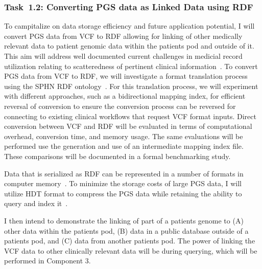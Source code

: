 \documentclass[a4paper,11pt]{article}
\begin{document}
\begin{refsection}
\newcommand\WPab{Converting PGS data as Linked Data using RDF}
\subsubsection{Task~1.2: \WPab}

To campitalize on data storage efficiency and future application potential, I will convert PGS data from VCF to RDF allowing for linking of other medically relevant data to patient genomic data within the patient\textquotesingle s pod and outside of it.
This aim will address well documented current challenges in medicial record utilization relating to scatteredness of pertinent clinical information~\cite{...}.
To convert PGS data from VCF to RDF, we will investigate a format translation process using the SPHN RDF ontology~\cite{van_der_horst_bridging_2023}. 
For this translation process, we will experiment with different approaches, such as a bidirectional mapping index, for efficient reversal of conversion to ensure the conversion process can be reversed for connecting to existing clinical workflows that request VCF format inputs. 
Direct conversion between VCF and RDF will be evaluated in terms of computational overhead, conversion time, and memory usage.
The same evaluations will be performed use the generation and use of an intermediate mapping index file. 
These comparisons will be documented in a formal benchmarking study.

Data that is serialized as RDF can be represented in a number of formats in computer memory~\cite{...}.
To minimize the storage costs of large PGS data, I will utilize HDT format to compress the PGS data while retaining the ability to query and index it~\cite{...}.

I then intend to demonstrate the linking of part of a patient\textquotesingle s genome to
(A) other data within the patient\textquotesingle s pod, 
(B) data in a public database outside of a patient\textquotesingle s pod, and
(C) data from another patient\textquotesingle s pod.
The power of linking the VCF data to other clinically relevant data will be during querying, which will be performed in Component 3.





\end{refsection}
\end{document}
